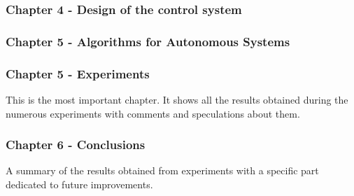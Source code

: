 \subsubsection*{Chapter 4 - Design of the control system}

\subsubsection*{Chapter 5 - Algorithms for Autonomous Systems} 


\subsubsection*{Chapter 5 - Experiments} 
This is the most important chapter. It shows all the results obtained during the numerous experiments with comments and speculations about them.

\subsubsection*{Chapter 6 - Conclusions} 
A summary of the results obtained from experiments with a specific part dedicated to future improvements.